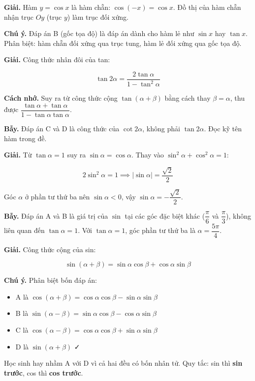 \documentclass[11pt, a4paper]{article}
\begin{document}
\begin{dapan}[9 — Đáp án A]
\textbf{Giải.} Hàm $y = \cos x$ là hàm chẵn: $\cos(-x) = \cos x$. Đồ thị của hàm chẵn nhận trục $Oy$ (trục $y$) làm trục đối xứng.

\textbf{Chú ý.} Đáp án B (gốc tọa độ) là đáp án dành cho hàm lẻ như $\sin x$ hay $\tan x$. Phân biệt: hàm chẵn đối xứng qua trục tung, hàm lẻ đối xứng qua gốc tọa độ.
\end{dapan}

\begin{dapan}[10 — Đáp án A]
\textbf{Giải.} Công thức nhân đôi của tan:

$$\tan 2\alpha = \frac{2\tan\alpha}{1-\tan^2\alpha}$$

\textbf{Cách nhớ.} Suy ra từ công thức cộng $\tan(\alpha+\beta)$ bằng cách thay $\beta = \alpha$, thu được $\dfrac{\tan\alpha + \tan\alpha}{1 - \tan\alpha\tan\alpha}$.

\textbf{Bẫy.} Đáp án C và D là công thức của $\cot 2\alpha$, không phải $\tan 2\alpha$. Đọc kỹ tên hàm trong đề.
\end{dapan}

\begin{dapan}[11 — Đáp án D]
\textbf{Giải.} Từ $\tan\alpha = 1$ suy ra $\sin\alpha = \cos\alpha$. Thay vào $\sin^2\alpha + \cos^2\alpha = 1$:

$$2\sin^2\alpha = 1 \implies |\sin\alpha| = \frac{\sqrt{2}}{2}$$

Góc $\alpha$ ở phần tư thứ ba nên $\sin\alpha < 0$, vậy $\sin\alpha = -\dfrac{\sqrt{2}}{2}$.

\textbf{Bẫy.} Đáp án A và B là giá trị của $\sin$ tại các góc đặc biệt khác ($\dfrac{\pi}{6}$ và $\dfrac{\pi}{3}$), không liên quan đến $\tan\alpha = 1$. Với $\tan\alpha = 1$, góc phần tư thứ ba là $\alpha = \dfrac{5\pi}{4}$.
\end{dapan}

\begin{dapan}[12 — Đáp án D]
\textbf{Giải.} Công thức cộng của sin:

$$\sin(\alpha+\beta) = \sin\alpha\cos\beta + \cos\alpha\sin\beta$$

\textbf{Chú ý.} Phân biệt bốn đáp án:
\begin{itemize}[leftmargin=1.4em, itemsep=2pt]
\item A là $\cos(\alpha+\beta) = \cos\alpha\cos\beta - \sin\alpha\sin\beta$
\item B là $\sin(\alpha-\beta) = \sin\alpha\cos\beta - \cos\alpha\sin\beta$
\item C là $\cos(\alpha-\beta) = \cos\alpha\cos\beta + \sin\alpha\sin\beta$
\item D là $\sin(\alpha+\beta)$ ✓
\end{itemize}


Học sinh hay nhầm A với D vì cả hai đều có bốn nhân tử. Quy tắc: sin thì \textbf{sin trước}, cos thì \textbf{cos trước}.
\end{dapan}
\end{document}
